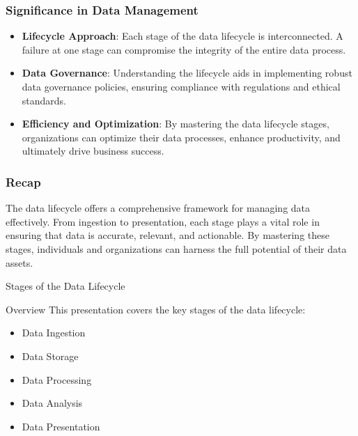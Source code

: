 \documentclass[aspectratio=169]{beamer}
\begin{document}
\begin{frame}[fragile]
    \frametitle{Significance in Data Management}
    \begin{itemize}
        \item \textbf{Lifecycle Approach}: Each stage of the data lifecycle is interconnected. A failure at one stage can compromise the integrity of the entire data process.
        \item \textbf{Data Governance}: Understanding the lifecycle aids in implementing robust data governance policies, ensuring compliance with regulations and ethical standards.
        \item \textbf{Efficiency and Optimization}: By mastering the data lifecycle stages, organizations can optimize their data processes, enhance productivity, and ultimately drive business success.
    \end{itemize}
\end{frame}

\begin{frame}[fragile]
    \frametitle{Recap}
    The data lifecycle offers a comprehensive framework for managing data effectively. From ingestion to presentation, each stage plays a vital role in ensuring that data is accurate, relevant, and actionable. By mastering these stages, individuals and organizations can harness the full potential of their data assets.
\end{frame}

\begin{frame}[fragile]{Stages of the Data Lifecycle}
    \begin{block}{Overview}
        This presentation covers the key stages of the data lifecycle:
        \begin{itemize}
            \item Data Ingestion
            \item Data Storage
            \item Data Processing
            \item Data Analysis
            \item Data Presentation
        \end{itemize}
    \end{block}
\end{frame}
\end{document}
